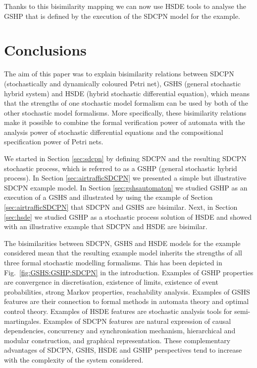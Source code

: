 \documentclass[copyright,creativecommons]{eptcs}
\begin{document}
Thanks to this bisimilarity mapping we can now use HSDE tools to
analyse the GSHP that is defined by the execution of the SDCPN
model for the example.


\section{Conclusions}\label{sec:conclusions}
The aim of this paper was to explain bisimilarity relations
between SDCPN (stochastically and dynamically coloured Petri net),
GSHS (general stochastic hybrid system) and HSDE (hybrid
stochastic differential equation), which means that the strengths
of one stochastic model formalism can be used by both of the other
stochastic model formalisms. More specifically, these bisimilarity
relations make it possible to combine the formal verification
power of automata with the analysis power of stochastic
differential equations and the compositional specification power
of Petri nets.

We started in Section \ref{sec:sdcpn} by defining SDCPN and the
resulting SDCPN stochastic process, which is referred to as a GSHP
(general stochastic hybrid process). In Section
\ref{sec:airtrafficSDCPN} we presented a simple but illustrative
SDCPN example model. In Section \ref{sec:gshsautomaton} we studied
GSHP as an execution of a GSHS and illustrated by using the
example of Section \ref{sec:airtrafficSDCPN} that SDCPN and GSHS
are bisimilar. Next, in Section \ref{sec:hsde} we studied GSHP as
a stochastic process solution of HSDE and showed with an
illustrative example that SDCPN and HSDE are bisimilar.

The bisimilarities between SDCPN, GSHS and HSDE models for the
example considered mean that the resulting example model inherits
the strengths of all three formal stochastic modelling formalisms.
This has been depicted in Fig.\ \ref{fig:GSHS:GSHP:SDCPN} in the
introduction. Examples of GSHP properties are convergence in
discretisation, existence of limits, existence of event
probabilities, strong Markov properties, reachability analysis.
Examples of GSHS features are their connection to formal methods
in automata theory and optimal control theory. Examples of HSDE
features are stochastic analysis tools for semi-martingales.
Examples of SDCPN features are natural expression of causal
dependencies, concurrency and synchronisation mechanism,
hierarchical and modular construction, and graphical
representation. These complementary advantages of SDCPN, GSHS,
HSDE and GSHP perspectives tend to increase with the complexity of
the system considered.
\end{document}

